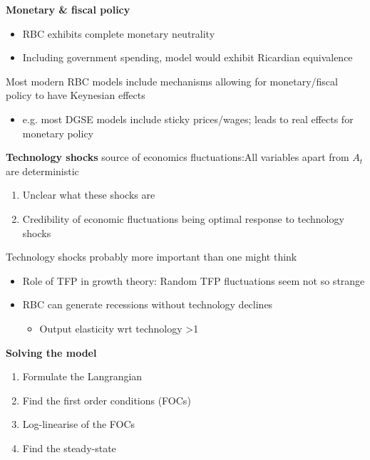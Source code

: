 \documentclass{beamer}
\begin{document}
\begin{frame}
  \textbf{Monetary \& fiscal policy}\\
   \begin{itemize}
     \item RBC exhibits complete monetary neutrality
     \item Including government spending, model would exhibit Ricardian equivalence
   \end{itemize}
   \medskip
    Most modern RBC models include mechanisms allowing for monetary/fiscal policy to have Keynesian effects
  \begin{itemize}
    \item e.g. most DGSE models include sticky prices/wages; leads to real effects for monetary policy
  \end{itemize}
\end{frame}

\begin{frame}
  \textbf{Technology shocks} source of economics fluctuations:All variables apart from $A_t$ are deterministic
  \begin{enumerate}
    \item Unclear what these shocks are
    \item Credibility of economic fluctuations being optimal response to technology shocks
  \end{enumerate}
  \medskip
  Technology shocks probably more important than one might think
  \begin{itemize}
    \item Role of TFP in growth theory: Random TFP fluctuations seem not so strange
    \item RBC can generate recessions without technology declines
    \begin{itemize}
      \item Output elasticity wrt technology >1
    \end{itemize}
  \end{itemize}
\end{frame}

\begin{frame}
 \textbf{Solving the model}
 \begin{enumerate}
  \item Formulate the Langrangian
  \item Find the first order conditions (FOCs)
  \item Log-linearise of the FOCs
  \item Find the steady-state
\end{enumerate}
\end{frame}
\end{document}

